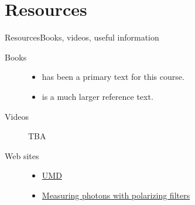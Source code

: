 \section*{Resources}
\begin{frame}{Resources}{Books, videos, useful information}
\begin{description}
    \item[Books]
    \begin{itemize}
        \item \Kaye{} has been a primary text for this course.
        \item \MikeIke{} is a much larger reference text.
    \end{itemize}
    \item[Videos] TBA
    \item[Web sites]
    \begin{itemize}
        \item \href{https://quantumatlas.umd.edu/}{UMD}
        \item \href{https://quantumatlas.umd.edu/gallery/MeasuringPolarization}{Measuring photons with polarizing filters}
    \end{itemize}
    
\end{description}
\end{frame}

